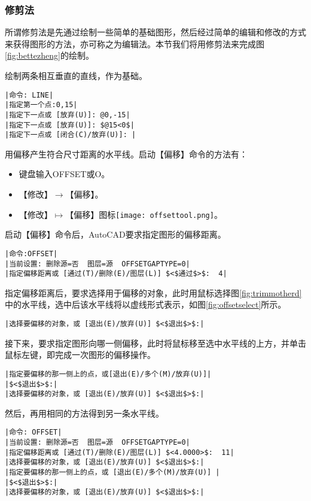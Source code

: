 \subsubsection{修剪法}
所谓修剪法是先通过绘制一些简单的基础图形，然后经过简单的编辑和修改的方式来获得图形的方法，亦可称之为编辑法。本节我们将用修剪法来完成图\ref{fig:bettezheng}的绘制。
\begin{procedure}
\item 绘制两条相互垂直的直线，作为基础。
\begin{lstlisting}
|命令: LINE|
|指定第一个点:0,15|
|指定下一点或 [放弃(U)]: @0,-15|
|指定下一点或 [放弃(U)]: $@15<0$|
|指定下一点或 [闭合(C)/放弃(U)]: |
\end{lstlisting}
\item 用偏移产生符合尺寸距离的水平线。启动【偏移】命令的方法有：
\begin{itemize}
\item 键盘输入OFFSET或O。
\item 【修改】$\rightarrow$【偏移】。
\item 【修改】$\mapsto$【偏移】图标\texttt{[image: offsettool.png]}。
\end{itemize}
启动【偏移】命令后，AutoCAD要求指定图形的偏移距离。
\begin{lstlisting}
|命令:OFFSET|
|当前设置: 删除源=否  图层=源  OFFSETGAPTYPE=0|
|指定偏移距离或 [通过(T)/删除(E)/图层(L)] $<$通过$>$:  4|
\end{lstlisting}
指定偏移距离后，要求选择用于偏移的对象，此时用鼠标选择图\ref{fig:trimmotherd}中的水平线，选中后该水平线将以虚线形式表示，如图\ref{fig:offsetselect}所示。
\begin{lstlisting}
|选择要偏移的对象，或 [退出(E)/放弃(U)] $<$退出$>$:|
\end{lstlisting}
接下来，要求指定图形向哪一侧偏移，此时将鼠标移至选中水平线的上方，并单击鼠标左键，即完成一次图形的偏移操作。
\begin{lstlisting}
|指定要偏移的那一侧上的点，或[退出(E)/多个(M)/放弃(U)]|
|$<$退出$>$:|
|选择要偏移的对象，或 [退出(E)/放弃(U)] $<$退出$>$:|
\end{lstlisting}
然后，再用相同的方法得到另一条水平线。
\begin{lstlisting}
|命令: OFFSET|
|当前设置: 删除源=否  图层=源  OFFSETGAPTYPE=0|
|指定偏移距离或 [通过(T)/删除(E)/图层(L)] $<4.0000>$:  11|
|选择要偏移的对象，或 [退出(E)/放弃(U)] $<$退出$>$:|
|指定要偏移的那一侧上的点，或 [退出(E)/多个(M)/放弃(U)] |
|$<$退出$>$:|
|选择要偏移的对象，或 [退出(E)/放弃(U)] $<$退出$>$:|
\end{lstlisting}


\end{procedure}
